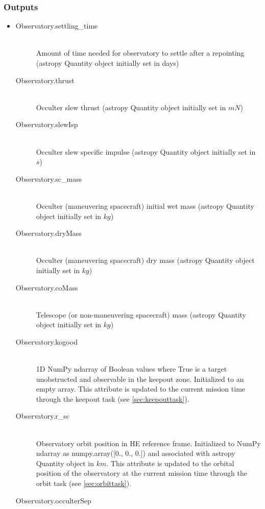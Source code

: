 \documentclass[cleanfoot]{asme2ej}
\begin{document}
\subsubsection*{Outputs}
\begin{itemize}
    \item
    \begin{description}
        \item[Observatory.settling\_time] \hfill \\
        Amount of time needed for observatory to settle after a repointing (astropy Quantity object initially set in days)
        \item[Observatory.thrust] \hfill \\
        Occulter slew thrust (astropy Quantity object initially set in $ mN $)
        \item[Observatory.slewIsp] \hfill \\
        Occulter slew specific impulse (astropy Quantity object initially set in $ s $)
        \item[Observatory.sc\_mass] \hfill \\
        Occulter (maneuvering spacecraft) initial wet mass (astropy Quantity object initially set in $ kg $)
        \item[Observatory.dryMass] \hfill \\
        Occulter (maneuvering spacecraft) dry mass (astropy Quantity object initially set in $ kg $)
        \item[Observatory.coMass] \hfill \\
        Telescope (or non-maneuvering spacecraft) mass (astropy Quantity object initially set in $ kg $)
        \item[Observatory.kogood] \hfill \\
        1D NumPy ndarray of Boolean values where True is a target unobstructed and observable in the keepout zone. Initialized to an empty array. This attribute is updated to the current mission time through the keepout task (see \ref{sec:keepouttask}).
        \item[Observatory.r\_sc] \hfill \\
        Observatory orbit position in HE reference frame. Initialized to NumPy ndarray as numpy.array([0., 0., 0.]) and associated with astropy Quantity object in $ km $. This attribute is updated to the orbital position of the observatory at the current mission time through the orbit task (see \ref{sec:orbittask}).
        \item[Observatory.occulterSep] \hfill \\

\end{description}
\end{itemize}
\end{document}
